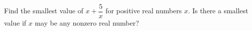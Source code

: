 Find the smallest value of $x+\dfrac{5}{x}$ for positive real numbers $x$. Is there a smallest value if $x$ may be any nonzero real number?
